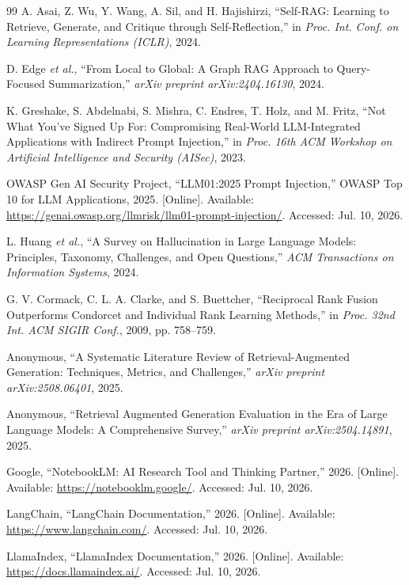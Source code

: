 \documentclass[conference]{IEEEtran}
\begin{document}
\begin{thebibliography}{99}
 A. Asai, Z. Wu, Y. Wang, A. Sil, and H. Hajishirzi, ``Self-RAG: Learning to Retrieve, Generate, and Critique through Self-Reflection,'' in \emph{Proc. Int. Conf. on Learning Representations (ICLR)}, 2024.

 D. Edge \emph{et al.}, ``From Local to Global: A Graph RAG Approach to Query-Focused Summarization,'' \emph{arXiv preprint arXiv:2404.16130}, 2024.

 K. Greshake, S. Abdelnabi, S. Mishra, C. Endres, T. Holz, and M. Fritz, ``Not What You've Signed Up For: Compromising Real-World LLM-Integrated Applications with Indirect Prompt Injection,'' in \emph{Proc. 16th ACM Workshop on Artificial Intelligence and Security (AISec)}, 2023.

 OWASP Gen AI Security Project, ``LLM01:2025 Prompt Injection,'' OWASP Top 10 for LLM Applications, 2025. [Online]. Available: \url{https://genai.owasp.org/llmrisk/llm01-prompt-injection/}. Accessed: Jul. 10, 2026.

 L. Huang \emph{et al.}, ``A Survey on Hallucination in Large Language Models: Principles, Taxonomy, Challenges, and Open Questions,'' \emph{ACM Transactions on Information Systems}, 2024.

 G. V. Cormack, C. L. A. Clarke, and S. Buettcher, ``Reciprocal Rank Fusion Outperforms Condorcet and Individual Rank Learning Methods,'' in \emph{Proc. 32nd Int. ACM SIGIR Conf.}, 2009, pp. 758--759.

 Anonymous, ``A Systematic Literature Review of Retrieval-Augmented Generation: Techniques, Metrics, and Challenges,'' \emph{arXiv preprint arXiv:2508.06401}, 2025.

 Anonymous, ``Retrieval Augmented Generation Evaluation in the Era of Large Language Models: A Comprehensive Survey,'' \emph{arXiv preprint arXiv:2504.14891}, 2025.

 Google, ``NotebookLM: AI Research Tool and Thinking Partner,'' 2026. [Online]. Available: \url{https://notebooklm.google/}. Accessed: Jul. 10, 2026.

 LangChain, ``LangChain Documentation,'' 2026. [Online]. Available: \url{https://www.langchain.com/}. Accessed: Jul. 10, 2026.

 LlamaIndex, ``LlamaIndex Documentation,'' 2026. [Online]. Available: \url{https://docs.llamaindex.ai/}. Accessed: Jul. 10, 2026.


\end{thebibliography}
\end{document}
